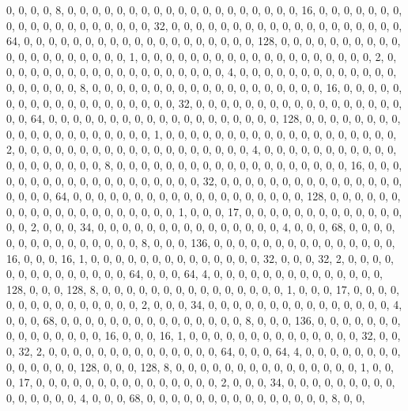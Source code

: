 \begin{DoxyCode}
       0, 0, 0, 0, 8, 0, 0, 0, 0, 0, 0, 0, 0, 0, 0, 0, 0, 0, 0, 0, 0, 0, 0, 0, 16, 0, 0, 0, 0, 0, 0, 0, 0, 0, 0,
       0, 0, 0, 0, 0, 0, 0, 0, 0, 32, 0, 0, 0, 0, 0, 0, 0, 0, 0, 0, 0, 0, 0, 0, 0, 0, 0, 0, 0, 64, 0, 0, 0, 0, 0, 0,
       0, 0, 0, 0, 0, 0, 0, 0, 0, 0, 0, 0, 0, 128, 0, 0, 0, 0, 0, 0, 0, 0, 0, 0, 0, 0, 0, 0, 0, 0, 0, 0, 0, 0, 1,
       0, 0, 0, 0, 0, 0, 0, 0, 0, 0, 0, 0, 0, 0, 0, 0, 0, 0, 0, 2, 0, 0, 0, 0, 0, 0, 0, 0, 0, 0, 0, 0, 0, 0, 0, 0,
       0, 0, 0, 4, 0, 0, 0, 0, 0, 0, 0, 0, 0, 0, 0, 0, 0, 0, 0, 0, 0, 0, 0, 8, 0, 0, 0, 0, 0, 0, 0, 0, 0, 0, 0, 0,
       0, 0, 0, 0, 0, 0, 0, 16, 0, 0, 0, 0, 0, 0, 0, 0, 0, 0, 0, 0, 0, 0, 0, 0, 0, 0, 0, 32, 0, 0, 0, 0, 0, 0, 0,
       0, 0, 0, 0, 0, 0, 0, 0, 0, 0, 0, 0, 64, 0, 0, 0, 0, 0, 0, 0, 0, 0, 0, 0, 0, 0, 0, 0, 0, 0, 0, 0, 128, 0, 0,
       0, 0, 0, 0, 0, 0, 0, 0, 0, 0, 0, 0, 0, 0, 0, 0, 0, 0, 1, 0, 0, 0, 0, 0, 0, 0, 0, 0, 0, 0, 0, 0, 0, 0, 0, 0,
       0, 0, 2, 0, 0, 0, 0, 0, 0, 0, 0, 0, 0, 0, 0, 0, 0, 0, 0, 0, 0, 0, 4, 0, 0, 0, 0, 0, 0, 0, 0, 0, 0, 0, 0, 0,
       0, 0, 0, 0, 0, 0, 8, 0, 0, 0, 0, 0, 0, 0, 0, 0, 0, 0, 0, 0, 0, 0, 0, 0, 0, 0, 16, 0, 0, 0, 0, 0, 0, 0, 0, 0,
       0, 0, 0, 0, 0, 0, 0, 0, 0, 0, 32, 0, 0, 0, 0, 0, 0, 0, 0, 0, 0, 0, 0, 0, 0, 0, 0, 0, 0, 0, 64, 0, 0, 0, 0,
       0, 0, 0, 0, 0, 0, 0, 0, 0, 0, 0, 0, 0, 0, 0, 128, 0, 0, 0, 0, 0, 0, 0, 0, 0, 0, 0, 0, 0, 0, 0, 0, 0, 0, 0, 0,
       1, 0, 0, 0, 17, 0, 0, 0, 0, 0, 0, 0, 0, 0, 0, 0, 0, 0, 0, 0, 2, 0, 0, 0, 34, 0, 0, 0, 0, 0, 0, 0, 0, 0, 0,
       0, 0, 0, 0, 0, 4, 0, 0, 0, 68, 0, 0, 0, 0, 0, 0, 0, 0, 0, 0, 0, 0, 0, 0, 0, 8, 0, 0, 0, 136, 0, 0, 0, 0, 0,
       0, 0, 0, 0, 0, 0, 0, 0, 0, 0, 16, 0, 0, 0, 16, 1, 0, 0, 0, 0, 0, 0, 0, 0, 0, 0, 0, 0, 0, 0, 32, 0, 0, 0, 32,
       2, 0, 0, 0, 0, 0, 0, 0, 0, 0, 0, 0, 0, 0, 0, 64, 0, 0, 0, 64, 4, 0, 0, 0, 0, 0, 0, 0, 0, 0, 0, 0, 0, 0, 0,
       128, 0, 0, 0, 128, 8, 0, 0, 0, 0, 0, 0, 0, 0, 0, 0, 0, 0, 0, 0, 0, 1, 0, 0, 0, 17, 0, 0, 0, 0, 0, 0, 0, 0,
       0, 0, 0, 0, 0, 0, 0, 2, 0, 0, 0, 34, 0, 0, 0, 0, 0, 0, 0, 0, 0, 0, 0, 0, 0, 0, 0, 4, 0, 0, 0, 68, 0, 0, 0, 0,
       0, 0, 0, 0, 0, 0, 0, 0, 0, 0, 0, 8, 0, 0, 0, 136, 0, 0, 0, 0, 0, 0, 0, 0, 0, 0, 0, 0, 0, 0, 0, 16, 0, 0, 0,
       16, 1, 0, 0, 0, 0, 0, 0, 0, 0, 0, 0, 0, 0, 0, 0, 32, 0, 0, 0, 32, 2, 0, 0, 0, 0, 0, 0, 0, 0, 0, 0, 0, 0, 0,
       0, 64, 0, 0, 0, 64, 4, 0, 0, 0, 0, 0, 0, 0, 0, 0, 0, 0, 0, 0, 0, 128, 0, 0, 0, 128, 8, 0, 0, 0, 0, 0, 0, 0,
       0, 0, 0, 0, 0, 0, 0, 0, 1, 0, 0, 0, 17, 0, 0, 0, 0, 0, 0, 0, 0, 0, 0, 0, 0, 0, 0, 0, 2, 0, 0, 0, 34, 0, 0,
       0, 0, 0, 0, 0, 0, 0, 0, 0, 0, 0, 0, 0, 4, 0, 0, 0, 68, 0, 0, 0, 0, 0, 0, 0, 0, 0, 0, 0, 0, 0, 0, 0, 8, 0, 0,

\end{DoxyCode}
